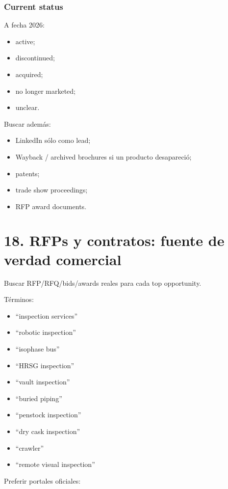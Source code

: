 \documentclass[11pt,a4paper]{article}
\begin{document}
\subsubsection*{Current status}
A fecha 2026:

\begin{itemize}
\item active;
\item discontinued;
\item acquired;
\item no longer marketed;
\item unclear.
\end{itemize}

Buscar además:

\begin{itemize}
\item LinkedIn sólo como lead;
\item Wayback / archived brochures si un producto desapareció;
\item patents;
\item trade show proceedings;
\item RFP award documents.
\end{itemize}


\section*{18. RFPs y contratos: fuente de verdad comercial}
Buscar RFP/RFQ/bids/awards reales para cada top opportunity.

Términos:

\begin{itemize}
\item ``inspection services''
\item ``robotic inspection''
\item ``isophase bus''
\item ``HRSG inspection''
\item ``vault inspection''
\item ``buried piping''
\item ``penstock inspection''
\item ``dry cask inspection''
\item ``crawler''
\item ``remote visual inspection''
\end{itemize}

Preferir portales oficiales:
\end{document}
